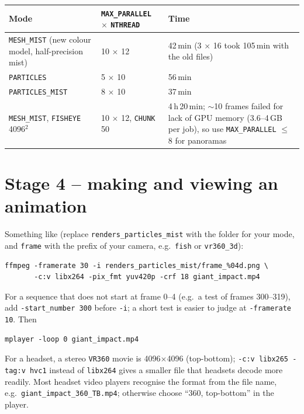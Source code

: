 \documentclass[11pt]{article}
\newcommand{\pc}[1]{\texttt{#1}}
\begin{document}
\begin{center}\small
\begin{tabular}{@{}P{4.4cm} P{4.6cm} P{5.5cm}@{}}
\hline
\textbf{Mode} & \textbf{\pc{MAX\_PARALLEL} $\times$ \pc{NTHREAD}} & \textbf{Time} \\
\hline
\pc{MESH\_MIST} (new colour model, half-precision mist) & 10 $\times$ 12 & 42\,min (3 $\times$ 16 took 105\,min with the old files) \\
\pc{PARTICLES} & 5 $\times$ 10 & 56\,min \\
\pc{PARTICLES\_MIST} & 8 $\times$ 10 & 37\,min \\
\pc{MESH\_MIST}, \pc{FISHEYE} 4096$^2$ & 10 $\times$ 12, \pc{CHUNK} 50 & 4\,h\,20\,min; $\sim$10 frames failed for lack of GPU memory (3.6--4\,GB per job), so use \pc{MAX\_PARALLEL} $\le$ 8 for panoramas \\
\hline
\end{tabular}
\end{center}
 
\section{Stage 4 -- making and viewing an animation}
\label{sec:movie}
Something like (replace \pc{renders\_particles\_mist} with the folder for your mode, and \pc{frame} with the prefix of your camera, e.g.\ \pc{fish} or \pc{vr360\_3d}):
\begin{verbatim}
ffmpeg -framerate 30 -i renders_particles_mist/frame_%04d.png \
       -c:v libx264 -pix_fmt yuv420p -crf 18 giant_impact.mp4
\end{verbatim}
For a sequence that does not start at frame 0--4 (e.g.\ a test of frames 300--319), add \pc{-start\_number 300} before \pc{-i}; a short test is easier to judge at \pc{-framerate 10}. Then
\begin{verbatim}
mplayer -loop 0 giant_impact.mp4
\end{verbatim}
For a headset, a stereo \pc{VR360} movie is 4096$\times$4096 (top-bottom); \pc{-c:v libx265 -tag:v hvc1} instead of \pc{libx264} gives a smaller file that headsets decode more readily. Most headset video players recognise the format from the file name, e.g.\ \pc{giant\_impact\_360\_TB.mp4}; otherwise choose ``360\textdegree, top-bottom'' in the player.
 
\end{document}
